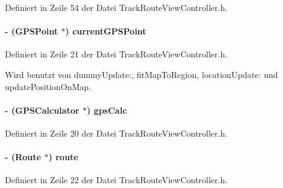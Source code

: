 Definiert in Zeile 54 der Datei TrackRouteViewController.h.\hypertarget{interface_track_route_view_controller_a8ce8f0629bb7838572fa5ab4cb1015f6}{
\paragraph[{currentGPSPoint}]{\setlength{\rightskip}{0pt plus 5cm}-\/ ({\bf GPSPoint} $\ast$) currentGPSPoint}\hfill}
\label{interface_track_route_view_controller_a8ce8f0629bb7838572fa5ab4cb1015f6}


Definiert in Zeile 21 der Datei TrackRouteViewController.h.

Wird benutzt von dummyUpdate:, fitMapToRegion, locationUpdate: und updatePositionOnMap.\hypertarget{interface_track_route_view_controller_a6283bcb2582d7b30fb3a14b85b8e0f3a}{
\paragraph[{gpsCalc}]{\setlength{\rightskip}{0pt plus 5cm}-\/ ({\bf GPSCalculator} $\ast$) gpsCalc}\hfill}
\label{interface_track_route_view_controller_a6283bcb2582d7b30fb3a14b85b8e0f3a}


Definiert in Zeile 20 der Datei TrackRouteViewController.h.\hypertarget{interface_track_route_view_controller_a9fd48f64851735328ea161516096137f}{
\paragraph[{route}]{\setlength{\rightskip}{0pt plus 5cm}-\/ ({\bf Route} $\ast$) route}\hfill}
\label{interface_track_route_view_controller_a9fd48f64851735328ea161516096137f}


Definiert in Zeile 22 der Datei TrackRouteViewController.h.

